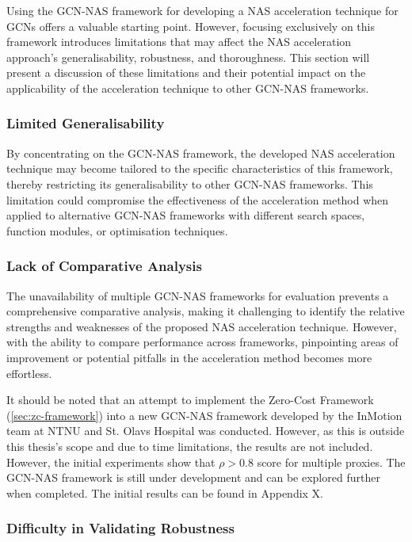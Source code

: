 Using the \gls{GCN}-\gls{NAS} framework for developing a \gls{NAS} acceleration technique for \glspl{GCN} offers a valuable starting point. However, focusing exclusively on this framework introduces limitations that may affect the \gls{NAS} acceleration approach's generalisability, robustness, and thoroughness. This section will present a discussion of these limitations and their potential impact on the applicability of the acceleration technique to other \gls{GCN}-\gls{NAS} frameworks.

\subsubsection{Limited Generalisability}
By concentrating on the \gls{GCN}-\gls{NAS} framework, the developed \gls{NAS} acceleration technique may become tailored to the specific characteristics of this framework, thereby restricting its generalisability to other \gls{GCN}-\gls{NAS} frameworks. This limitation could compromise the effectiveness of the acceleration method when applied to alternative \gls{GCN}-\gls{NAS} frameworks with different search spaces, function modules, or optimisation techniques.

\subsubsection{Lack of Comparative Analysis}
The unavailability of multiple \gls{GCN}-\gls{NAS} frameworks for evaluation prevents a comprehensive comparative analysis, making it challenging to identify the relative strengths and weaknesses of the proposed \gls{NAS} acceleration technique. However, with the ability to compare performance across frameworks, pinpointing areas of improvement or potential pitfalls in the acceleration method becomes more effortless. 

It should be noted that an attempt to implement the Zero-Cost Framework (\cref{sec:zc-framework}) into a new \gls{GCN}-\gls{NAS} framework developed by the InMotion team at \gls{NTNU} and St. Olavs Hospital was conducted. However, as this is outside this thesis's scope and due to time limitations, the results are not included. However, the initial experiments show that $ \rho >0.8$ score for multiple proxies. The \gls{GCN}-\gls{NAS} framework is still under development and can be explored further when completed. The initial results can be found in Appendix X. 


    
\subsubsection{Difficulty in Validating Robustness}

